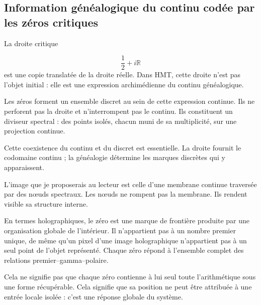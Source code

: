 \subsection{Information généalogique du continu codée par les zéros critiques}
La droite critique\par
\[
\frac12+i\mathbb R
\]
est une copie translatée de la droite réelle. Dans HMT, cette droite n'est pas l'objet initial : elle est une expression archimédienne du continu généalogique.\par
Les zéros forment un ensemble discret au sein de cette expression continue. Ils ne perforent pas la droite et n'interrompent pas le continu. Ils constituent un diviseur spectral : des points isolés, chacun muni de sa multiplicité, sur une projection continue.\par
Cette coexistence du continu et du discret est essentielle. La droite fournit le codomaine continu ; la généalogie détermine les marques discrètes qui y apparaissent.\par
L'image que je proposerais au lecteur est celle d'une membrane continue traversée par des nœuds spectraux. Les nœuds ne rompent pas la membrane. Ils rendent visible sa structure interne.\par
En termes holographiques, le zéro est une marque de frontière produite par une organisation globale de l'intérieur. Il n'appartient pas à un nombre premier unique, de même qu'un pixel d'une image holographique n'appartient pas à un seul point de l'objet représenté. Chaque zéro répond à l'ensemble complet des relations premier–gamma–polaire.\par
Cela ne signifie pas que chaque zéro contienne à lui seul toute l'arithmétique sous une forme récupérable. Cela signifie que sa position ne peut être attribuée à une entrée locale isolée : c'est une réponse globale du système.\par
{}
